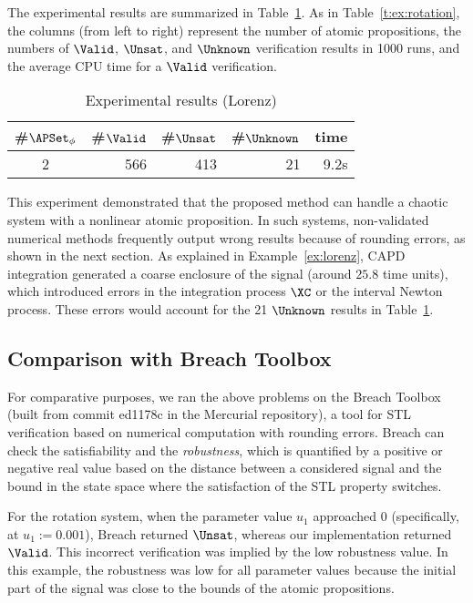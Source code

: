 \documentclass[paper]{ieice}
\begin{document}
The experimental results are summarized in Table~\ref{t:ex:lorenz}.
As in Table~\ref{t:ex:rotation}, the columns (from left to right) represent the number of atomic propositions, the numbers of $\Valid$, $\Unsat$, and $\Unknown$ verification results in 1000 runs, and the average CPU time for a $\Valid$ verification.

\begin{table}[ht]
\begin{center}
	\caption{\label{t:ex:lorenz} Experimental results (Lorenz)} 
    \begin{tabular}{c|r|r|r|r} \hline\hline
		\#$\APSet_\phi$ & \#$\Valid$ & \#$\Unsat$ & \#$\Unknown$ & time \\
		\hline
		2 & 566 & 413 & 21 & 9.2s \\
		\hline
	\end{tabular}
\end{center}
\end{table}

This experiment demonstrated that the proposed method can handle a chaotic system with a nonlinear atomic proposition. In such systems, non-validated numerical methods frequently output wrong results because of rounding errors, as shown in the next section.
As explained in Example~\ref{ex:lorenz}, CAPD integration generated a coarse enclosure of the signal (around $25.8$ time units), which introduced errors in the integration process $\XC$ or the interval Newton process.
These errors would account for the 21 $\Unknown$ results in Table~\ref{t:ex:lorenz}.


\subsection{Comparison with Breach Toolbox}

For comparative purposes, we ran the above problems on the Breach Toolbox~\cite{Donze2010a} (built from commit ed1178c in the Mercurial repository), a tool for STL verification based on numerical computation with rounding errors.
Breach can check the satisfiability and the \emph{robustness}, which is quantified by a positive or negative real value based on the distance between a considered signal and the bound in the state space where the satisfaction of the STL property switches.

For the rotation system, when the parameter value $u_1$ approached 0 (specifically, at $u_1 := 0.001$), Breach returned $\Unsat$, whereas our implementation returned $\Valid$.
This incorrect verification was implied by the low robustness value.
In this example, the robustness was low for all parameter values because the initial part of the signal was close to the bounds of the atomic propositions.
\end{document}
